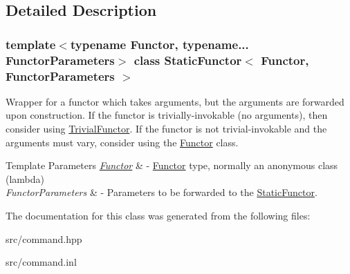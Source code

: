 \subsection{Detailed Description}
\subsubsection*{template$<$typename Functor, typename... Functor\+Parameters$>$\newline
class Static\+Functor$<$ Functor, Functor\+Parameters $>$}

Wrapper for a functor which takes arguments, but the arguments are forwarded upon construction. If the functor is trivially-\/invokable (no arguments), then consider using \mbox{\hyperlink{class_trivial_functor}{Trivial\+Functor}}. If the functor is not trivial-\/invokable and the arguments must vary, consider using the \mbox{\hyperlink{class_functor}{Functor}} class. 
\begin{DoxyTemplParams}{Template Parameters}
{\em \mbox{\hyperlink{class_functor}{Functor}}} & -\/ \mbox{\hyperlink{class_functor}{Functor}} type, normally an anonymous class (lambda) \\
\hline
{\em Functor\+Parameters} & -\/ Parameters to be forwarded to the \mbox{\hyperlink{class_static_functor}{Static\+Functor}}. \\
\hline
\end{DoxyTemplParams}


The documentation for this class was generated from the following files\+:\begin{DoxyCompactItemize}
\item 
src/command.\+hpp\item 
src/command.\+inl\end{DoxyCompactItemize}
